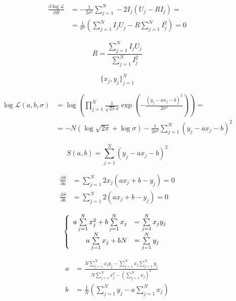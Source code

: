 \documentclass{article}
\begin{document}
\begin{align*}
\frac{\partial\log\mathcal{L}}{\partial R} &=  -\frac{1}{2\sigma^2}\sum\limits_{j=1}^N -2I_j (U_j- R I_j) = \\
&= \frac{1}{\sigma^2}\left(\sum\limits_{j=1}^N I_jU_j - R\sum\limits_{j=1}^N I_j^2\right) = 0
\end{align*}

$$
R = \frac{\sum\limits_{j=1}^N I_jU_j}{\sum\limits_{j=1}^N I_j^2}
$$

$$
\{x_j, y_j\}_{j=1}^{N}
$$

\begin{align*}
\log \mathcal{L}(a, b,\sigma) & = \log \left(\prod\limits_{j=1}^N  \frac{1}{\sqrt{2\pi}\sigma} \exp\left(-\frac{(y_j - a x_j - b)^2}{2\sigma^2}\right)\right) =\\
& = -N \left(\log\sqrt{2\pi} + \log\sigma\right) - \frac{1}{2\sigma^2} \sum\limits_{j=1}^N (y_j- a x_j - b)^2
\end{align*}


$$
S(a, b) = \sum\limits_{j=1}^N (y_j- a x_j - b)^2
$$


\begin{align*}
\frac{\partial S}{\partial a} &= \sum\limits_{j=1}^N 2 x_j (a x_j + b - y_j) = 0 \\
\frac{\partial S}{\partial b} &= \sum\limits_{j=1}^N 2 (a x_j + b - y_j) = 0
\end{align*}

$$
\left \{ \begin{array}{r l}
a \sum\limits_{j=1}^N x_j^2 + b \sum\limits_{j=1}^N x_j  & = \sum\limits_{j=1}^N x_j y_j\\
a \sum\limits_{j=1}^N x_j   + b N                        & = \sum\limits_{j=1}^N y_j
\end{array} \right.
$$

\begin{align*}
a &= \frac{N \sum\limits_{j=1}^N x_j y_j - \sum\limits_{j=1}^N x_j \sum\limits_{j=1}^N y_j}{N\sum\limits_{j=1}^N x_j^2 - \left(\sum\limits_{j=1}^N x_j\right)^2} \\
b &= \frac{1}{N}\left(  \sum\limits_{j=1}^N y_j - a  \sum\limits_{j=1}^N x_j \right)
\end{align*}
\end{document}
